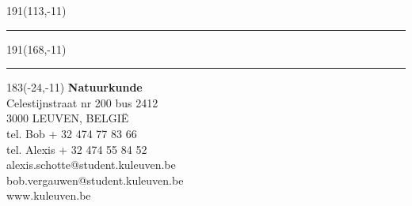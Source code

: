 \newpage
\thispagestyle{empty}
\sffamily
%
\begin{textblock}{191}(113,-11)
{\color{blueline}\rule{160pt}{5.5pt}}
\end{textblock}
%
\begin{textblock}{191}(168,-11)
{\color{blueline}\rule{5.5pt}{59pt}}
\end{textblock}
%
\begin{textblock}{183}(-24,-11)
\textblockcolour{}
\flushright
\fontsize{7}{7.5}\selectfont
\textbf{Natuurkunde}\\
Celestijnstraat nr 200 bus 2412\\
3000 LEUVEN, BELGI\"{E}\\
tel. Bob + 32 474 77 83 66\\
tel. Alexis + 32 474 55 84 52\\
alexis.schotte@student.kuleuven.be\\
bob.vergauwen@student.kuleuven.be\\
www.kuleuven.be\\
\end{textblock}
%
